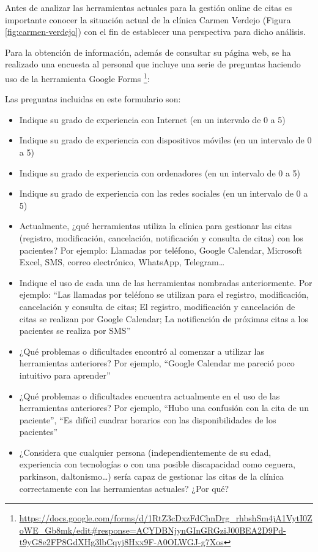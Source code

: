 Antes de analizar las herramientas actuales para la gestión online de citas es importante conocer la situación actual de la clínica Carmen Verdejo (Figura \ref{fig:carmen-verdejo}) con el fin de establecer una perspectiva para dicho análisis.\bigskip

Para la obtención de información, además de consultar su página web, se ha realizado una encuesta al personal que incluye una serie de preguntas haciendo uso de la herramienta Google Forms \footnote{\url{https://docs.google.com/forms/d/1RtZ3cDxzFdChnDrg_rhbshSm4jA1VytI0ZoWE_Gb8mk/edit#response=ACYDBNjynGInGRGziJ00BEA2D9Pd-t9yG8e2FP8GdXHg3lbCqvj8Hxx9F-A0OLWGJ-g7Xos}}: \bigskip

Las preguntas incluidas en este formulario son:
\begin{itemize}
    \item Indique su grado de experiencia con Internet (en un intervalo de 0 a 5)
    \item Indique su grado de experiencia con dispositivos móviles (en un intervalo de 0 a 5)
    \item Indique su grado de experiencia con ordenadores (en un intervalo de 0 a 5)
    \item Indique su grado de experiencia con las redes sociales (en un intervalo de 0 a 5)
    \item Actualmente, ¿qué herramientas utiliza la clínica para gestionar las citas (registro, modificación, cancelación, notificación y consulta de citas) con los pacientes? Por ejemplo: Llamadas por teléfono, Google Calendar, Microsoft Excel, SMS, correo electrónico, WhatsApp, Telegram… 
    \item Indique el uso de cada una de las herramientas nombradas anteriormente. Por ejemplo: “Las llamadas por teléfono se utilizan para el registro, modificación, cancelación y consulta de citas; El registro, modificación y cancelación de citas se realizan por Google Calendar; La notificación de próximas citas a los pacientes se realiza por SMS”
    \item ¿Qué problemas o dificultades encontró al comenzar a utilizar las herramientas anteriores? Por ejemplo, “Google Calendar me pareció poco intuitivo para aprender”
    \item ¿Qué problemas o dificultades encuentra actualmente en el uso de las herramientas anteriores? Por ejemplo, “Hubo una confusión con la cita de un paciente”, “Es difícil cuadrar horarios con las disponibilidades de los pacientes”
    \item ¿Considera que cualquier persona (independientemente de su edad, experiencia con tecnologías o con una posible discapacidad como ceguera, parkinson, daltonismo…) sería capaz de gestionar las citas de la clínica correctamente con las herramientas actuales? ¿Por qué?

\end{itemize}
